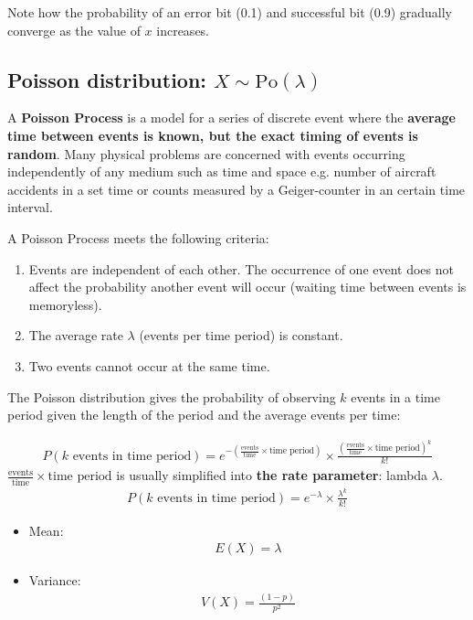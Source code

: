 \documentclass[10pt,a4paper]{article}
\begin{document}
Note how the probability of an error bit (0.1) and successful bit (0.9) gradually converge as the
value of $x$ increases.

\subsection{Poisson distribution: $X \sim \text{Po}(\lambda)$}

A \textbf{Poisson Process} is a model for a series of discrete event where the \textbf{average time
between events is known, but the exact timing of events is random}. Many physical problems are
concerned with events occurring independently of any medium such as time and space e.g. number of
aircraft accidents in a set time or counts measured by a Geiger-counter in an certain time interval.

A Poisson Process meets the following criteria:
\begin{enumerate}
    \item Events are independent of each other. The occurrence of one event does not affect the
    probability another event will occur (waiting time between events is memoryless).
    \item The average rate $\lambda$ (events per time period) is constant.
    \item Two events cannot occur at the same time.
\end{enumerate}

The Poisson distribution gives the probability of observing $k$ events in a time period given the
length of the period and the average events per time: \par
\begin{align*}
    P(k\text{ events in time period}) = e^{-\left(\frac{\text{events}}{\text{time}}\times \text{time period}\right)} \times \frac{\left(\frac{\text{events}}{\text{time}}\times \text{time period}\right)^k}{k!}
\end{align*}
$\frac{\text{events}}{\text{time}} \times \text{time period}$ is usually simplified into \textbf{the
rate parameter}: lambda $\lambda$.
\begin{align*}
    P(k\text{ events in time period}) = e^{-\lambda} \times \frac{\lambda^k}{k!}
\end{align*}

\begin{itemize}
    \item Mean: 
    \begin{align*}
        E(X) = \lambda
    \end{align*}
    \item Variance: 
    \begin{align*}
        V(X) = \frac{(1-p)}{p^2}
    \end{align*}
\end{itemize}
\end{document}
